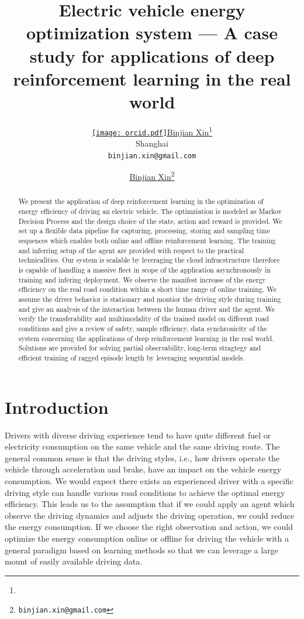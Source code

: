 \documentclass{article}
\title{Electric vehicle energy optimization system --- A case study for applications of deep reinforcement learning in the real world}
\author{ \href{https://orcid.org/0009-0003-0705-2612}{\texttt{[image: orcid.pdf]}\hspace{1mm}Binjian Xin}\thanks{} \\
	Shanghai\\
	\texttt{binjian.xin@gmail.com} \\
}
\author[1]{%
	\href{https://orcid.org/0009-0003-0705-2612}{\usebox{\orcid}\hspace{1mm}Binjian Xin\thanks{\texttt{binjian.xin@gmail.com}}}%
}
\affil[1]{}
\begin{document}
\maketitle

\begin{abstract}
	We present the application of deep reinforcement learning in the optimization of energy efficiency of driving an electric vehicle. The optimziation is modeled as Markov Decision Process and the design choice of the state, action and reward is provided. We set up a flexible data pipeline for capturing, processing, storing and sampling time sequences which enables both online and offline reinforcement learning. The training and inferring setup of the agent are provided with respect to the practical technicalities. Our system is scalable by leveraging the cloud infrucstructure therefore is capable of handling a massive fleet in scope of the application asynchronously in training and infering deployment. We observe the manifest increase of the energy efficiency on the real road condition within a short time range of online training. We assume the driver behavior is stationary and montior the driving style during training and give an analysis of the interaction between the human driver and the agent. We verify the transferability and multimodality of the trained model on different road conditions and give a review of safety, sample efficiency, data synchronicity of the system concerning the applications of deep reinforcement learning in the real world. Solutions are provided for solving partial observability, long-term stragtegy and efficient training of ragged episode length by leveraging sequential models.
\end{abstract}


\section{Introduction}
\label{sec:intro}

Drivers with diverse driving experience tend to have quite different fuel or electricity consumption on the same vehicle and the same driving route. The general common sense is that the driving styles, i.e., how drivers operate the vehicle through acceleration and brake, have an impact on the vehicle energy consumption. We would expect there exists an experienced driver with a specific driving style can handle various road conditions to achieve the optimal energy efficiency. This leads us to the assumption that if we could apply an agent which observe the driving dynamics and adjusts the driving operation, we could reduce the energy consumption. If we choose the right observation and action, we could optimize the energy consumption online or offline for driving the vehicle with a general paradigm based on learning methods so that we can leverage a large mount of easily available driving data.
\end{document}
